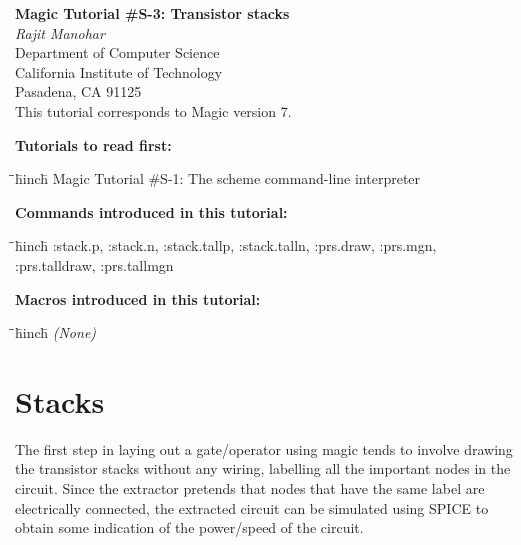 \documentclass[letterpaper,twoside,12pt]{article}
\def\hinch{\hspace*{0.5in}}
\def\starti{\begin{center}\begin{tabbing}\hinch\=\hinch\=\hinch\=hinch\hinch\=\kill}
\def\endi{\end{tabbing}\end{center}}
\def\mytitle{Magic Tutorial \#S-3: Transistor stacks}
\begin{document}
\makeatletter
\newcommand{\ps@magic}{%
	\renewcommand{\@oddhead}{\mytitle\hfil\today}%
	\renewcommand{\@evenhead}{\today\hfil\mytitle}%
	\renewcommand{\@evenfoot}{\hfil\textrm{--{\thepage}--}\hfil}%
	\renewcommand{\@oddfoot}{\@evenfoot}}
\newcommand{\ps@mplain}{%
	\renewcommand{\@oddhead}{}%
	\renewcommand{\@evenhead}{}%
	\renewcommand{\@evenfoot}{\hfil\textrm{--{\thepage}--}\hfil}%
	\renewcommand{\@oddfoot}{\@evenfoot}}
\makeatother
\pagestyle{magic}
\thispagestyle{mplain}

\begin{center}
  {\bfseries \Large \mytitle} \\
  \vspace*{0.5in}
  {\itshape Rajit Manohar} \\
  \vspace*{0.5in}
   Department of Computer Science \\
   California Institute of Technology \\
   Pasadena, CA  91125 \\
  \vspace*{0.25in}
  This tutorial corresponds to Magic version 7. \\
\end{center}
\vspace*{0.5in}

{\noindent\bfseries\large Tutorials to read first:}
\starti
   \> Magic Tutorial \#S-1: The scheme command-line interpreter
\endi

{\noindent\bfseries\large Commands introduced in this tutorial:}
\starti
   \> :stack.p, :stack.n, :stack.tallp, :stack.talln, :prs.draw, :prs.mgn, \\
   \> :prs.talldraw, :prs.tallmgn
\endi

{\noindent\bfseries\large Macros introduced in this tutorial:}

\starti
   \> {\itshape (None)}
\endi

\vspace*{0.75in}
\section{Stacks}

The first step in laying out a gate/operator using magic tends to
involve drawing the transistor stacks without any wiring, labelling
all the important nodes in the circuit. Since the extractor pretends
that nodes that have the same label are electrically connected, the
extracted circuit can be simulated using SPICE to obtain some
indication of the power/speed of the circuit.
\end{document}
